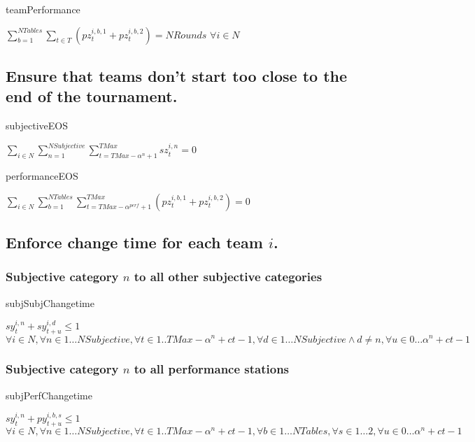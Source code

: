 \documentclass[letterpaper,11pt]{report}
\begin{document}
\begin{algorithm}
\caption{teamPerformance}
$\sum\limits_{b=1}^{NTables} \sum\limits_{t \in T} ( pz_{t}^{i,b,1} + pz_{t}^{i,b,2} ) = NRounds$
\hfill $\forall i \in N$
\end{algorithm}

\FloatBarrier
\subsection{Ensure that teams don't start too close to the end of the
  tournament.}
\begin{algorithm}
\caption{subjectiveEOS}
$\sum\limits_{i \in N}\sum\limits_{n=1}^{NSubjective}\sum\limits_{t=TMax-\alpha^{n}+1}^{TMax} sz_{t}^{i,n} = 0$
\end{algorithm}

\begin{algorithm}
\caption{performanceEOS}
$\sum\limits_{i \in
  N}\sum\limits_{b=1}^{NTables}\sum\limits_{t=TMax-\alpha^{perf}+1}^{TMax}
  ( pz_{t}^{i,b,1} + pz_{t}^{i,b,2} ) = 0$
\end{algorithm}


\FloatBarrier
\subsection{Enforce change time for each team $i$.}

\subsubsection{Subjective category $n$ to all other subjective categories}
\begin{algorithm}
\caption{subjSubjChangetime}
$sy_{t}^{i,n} + sy_{t+u}^{i,d} \le 1$
\hfill $\forall i \in N,
\forall n \in 1 \dots NSubjective, 
\forall t \in 1..{TMax-\alpha^{n} + ct-1},
\forall d \in 1 \dots NSubjective \wedge d \neq n,
\forall u \in 0 \dots \alpha^{n} + ct-1$
\end{algorithm}

\subsubsection{Subjective category $n$ to all performance stations}
\begin{algorithm}
\caption{subjPerfChangetime}
$sy_{t}^{i,n} + py_{t+u}^{i,b,s} \le 1$
\hfill $\forall i \in N,
\forall n \in 1 \dots NSubjective, 
\forall t \in 1..{TMax-\alpha^{n} + ct-1},
\forall b \in 1 \dots NTables,
\forall s \in 1 \dots 2,
\forall u \in 0 \dots \alpha^{n}+ ct-1
$
\end{algorithm}
\end{document}
